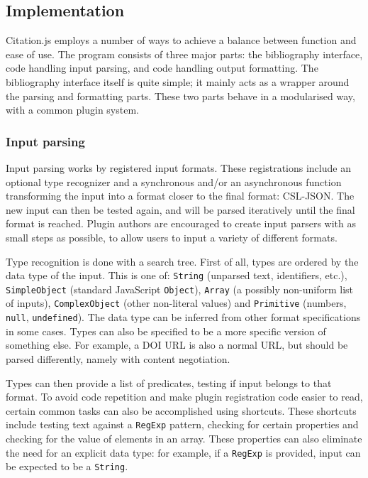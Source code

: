 \documentclass[fleqn,10pt,lineno]{wlpeerj} %
\begin{document}
\subsection*{Implementation}

Citation.js employs a number of ways to achieve a balance between function and ease of use. The program consists of three major parts: the bibliography interface, code handling input parsing, and code handling output formatting. The bibliography interface itself is quite simple; it mainly acts as a wrapper around the parsing and formatting parts. These two parts behave in a modularised way, with a common plugin system.

\subsubsection*{Input parsing}

Input parsing works by registered input formats. These registrations include an optional type recognizer and a synchronous and/or an asynchronous function transforming the input into a format closer to the final format: CSL-JSON. The new input can then be tested again, and will be parsed iteratively until the final format is reached. Plugin authors are encouraged to create input parsers with as small steps as possible, to allow users to input a variety of different formats.

Type recognition is done with a search tree. First of all, types are ordered by the data type of the input. This is one of: \texttt{String} (unparsed text, identifiers, etc.), \texttt{SimpleObject} (standard JavaScript \texttt{Object}), \texttt{Array} (a possibly non-uniform list of inputs), \texttt{ComplexObject} (other non-literal values) and \texttt{Primitive} (numbers, \texttt{null}, \texttt{undefined}). The data type can be inferred from other format specifications in some cases. Types can also be specified to be a more specific version of something else. For example, a DOI URL is also a normal URL, but should be parsed differently, namely with content negotiation.

Types can then provide a list of predicates, testing if input belongs to that format. To avoid code repetition and make plugin registration code easier to read, certain common tasks can also be accomplished using shortcuts. These shortcuts include testing text against a \texttt{RegExp} pattern, checking for certain properties and checking for the value of elements in an array. These properties can also eliminate the need for an explicit data type: for example, if a \texttt{RegExp} is provided, input can be expected to be a \texttt{String}.
\end{document}
